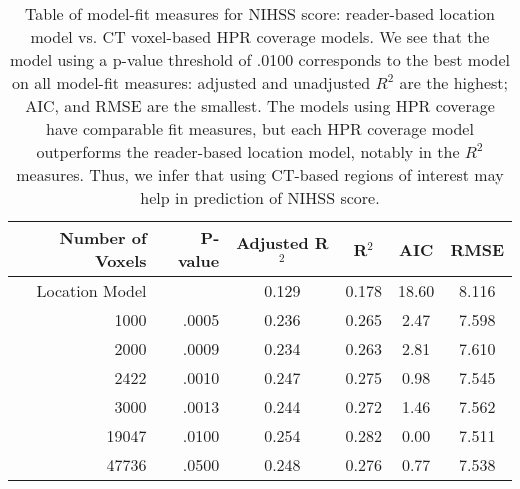 \begin{table}[H]
\centering
\begin{tabular}{rr|cccc}
  \hline
{\bf Number of Voxels} & {\bf P-value} & {\bf Adjusted R$^2$} & {\bf R$^2$} & {\bf AIC} & {\bf RMSE} \\ 
  \hline
Location Model &  & 0.129 & 0.178 & 18.60 & 8.116 \\ 
  1000 & .0005 & 0.236 & 0.265 & 2.47 & 7.598 \\ 
  2000 & .0009 & 0.234 & 0.263 & 2.81 & 7.610 \\ 
  2422 & .0010 & 0.247 & 0.275 & 0.98 & 7.545 \\ 
  3000 & .0013 & 0.244 & 0.272 & 1.46 & 7.562 \\ 
  19047 & .0100 & 0.254 & 0.282 & 0.00 & 7.511 \\ 
  47736 & .0500 & 0.248 & 0.276 & 0.77 & 7.538 \\ 
   \hline
\end{tabular}
\caption{Table of model-fit measures for NIHSS score: reader-based location model vs. CT voxel-based HPR coverage models. We see that the model using a p-value threshold of .0100 corresponds to the best model on all model-fit measures: adjusted and unadjusted $R^2$ are the highest; AIC, and RMSE are the smallest.  The models using HPR coverage have comparable fit measures, but each HPR coverage model outperforms the reader-based location model, notably in the $R^2$ measures.  Thus, we infer that using CT-based regions of interest may help in prediction of NIHSS score.} 
\label{t:nihss}
\end{table}
